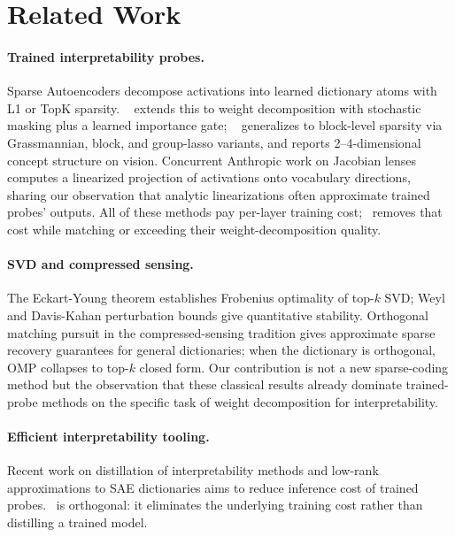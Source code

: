 \section{Related Work}
\label{sec:related}

\paragraph{Trained interpretability probes.} Sparse Autoencoders \citep{bricken2023towards,cunningham2023sparse} decompose activations into learned dictionary atoms with L1 or TopK sparsity. \vpd\ \citep{bushnaq2026vpd} extends this to weight decomposition with stochastic masking plus a learned importance gate; \bsf\ \citep{goodfire2026bsf} generalizes to block-level sparsity via Grassmannian, block, and group-lasso variants, and reports 2--4-dimensional concept structure on vision. Concurrent Anthropic work on Jacobian lenses \citep{anthropic2026jlens} computes a linearized projection of activations onto vocabulary directions, sharing our observation that analytic linearizations often approximate trained probes' outputs. All of these methods pay per-layer training cost; \svdomp\ removes that cost while matching or exceeding their weight-decomposition quality.

\paragraph{SVD and compressed sensing.} The Eckart-Young theorem \citep{eckart1936approximation} establishes Frobenius optimality of top-$k$ SVD; Weyl and Davis-Kahan perturbation bounds \citep{davis1970rotation} give quantitative stability. Orthogonal matching pursuit \citep{pati1993omp} in the compressed-sensing tradition gives approximate sparse recovery guarantees for general dictionaries; when the dictionary is orthogonal, OMP collapses to top-$k$ closed form. Our contribution is not a new sparse-coding method but the observation that these classical results already dominate trained-probe methods on the specific task of weight decomposition for interpretability.

\paragraph{Efficient interpretability tooling.} Recent work on distillation of interpretability methods \citep{efficient2026distill} and low-rank approximations to SAE dictionaries \citep{low2026sae} aims to reduce inference cost of trained probes. \svdomp\ is orthogonal: it eliminates the underlying training cost rather than distilling a trained model.
